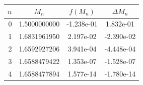\begin{tabular}{rccc}
\toprule
$n$ & $M_n$ & $f(M_n)$ & $\Delta M_n$ \\
\midrule
0 & 1.5000000000 & -1.238e-01 & 1.832e-01 \\
1 & 1.6831961950 & 2.197e-02 & -2.390e-02 \\
2 & 1.6592927206 & 3.941e-04 & -4.448e-04 \\
3 & 1.6588479422 & 1.353e-07 & -1.528e-07 \\
4 & 1.6588477894 & 1.577e-14 & -1.780e-14 \\
\bottomrule
\end{tabular}